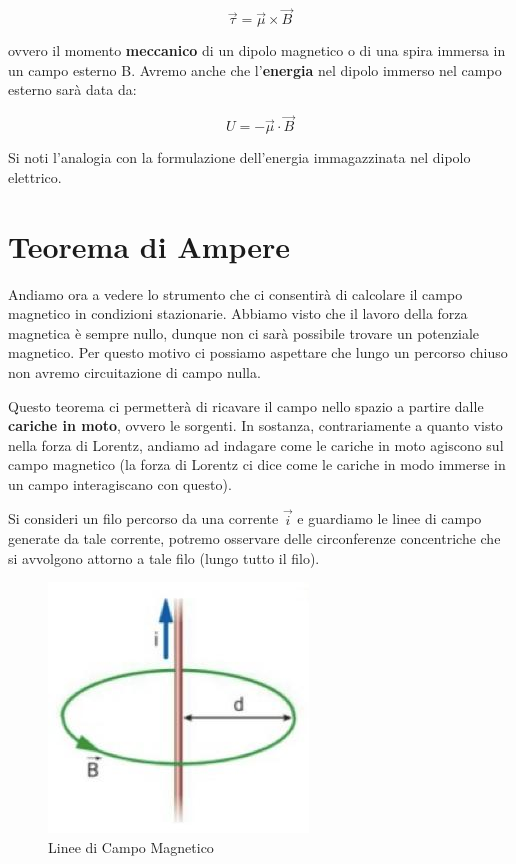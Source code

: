 $$\vec{\tau} = \vec{\mu} \times \vec{B} $$

ovvero il momento \textbf{meccanico} di un dipolo magnetico o di una spira immersa in un campo esterno B. Avremo anche che l'\textbf{energia} nel dipolo immerso nel campo esterno sarà data da: 

\begin{equation}
	U = -\vec{\mu} \cdot \vec{B}
\end{equation}

Si noti l'analogia con la formulazione dell'energia immagazzinata nel dipolo elettrico.

\section{Teorema di Ampere}
Andiamo ora a vedere lo strumento che ci consentirà di calcolare il campo magnetico in condizioni stazionarie. Abbiamo visto che il lavoro della forza magnetica è sempre nullo, dunque non ci sarà possibile trovare un potenziale magnetico. Per questo motivo ci possiamo aspettare che lungo un percorso chiuso non avremo circuitazione di campo nulla. 

Questo teorema ci permetterà di ricavare il campo nello spazio a partire dalle \textbf{cariche in moto}, ovvero le sorgenti. In sostanza, contrariamente a quanto visto nella forza di Lorentz, andiamo ad indagare come le cariche in moto agiscono sul campo magnetico (la forza di Lorentz ci dice come le cariche in modo immerse in un campo interagiscano con questo). 

Si consideri un filo percorso da una corrente $\vec{i}$ e guardiamo le linee di campo generate da tale corrente, potremo osservare delle circonferenze concentriche che si avvolgono attorno a tale filo (lungo tutto il filo). 

\begin{figure}[th]
	\centering
	\includegraphics[width=0.5\linewidth]{Media/linee_campo_B}
	\caption{Linee di Campo Magnetico}
	\label{fig:lineecampob}
\end{figure}

